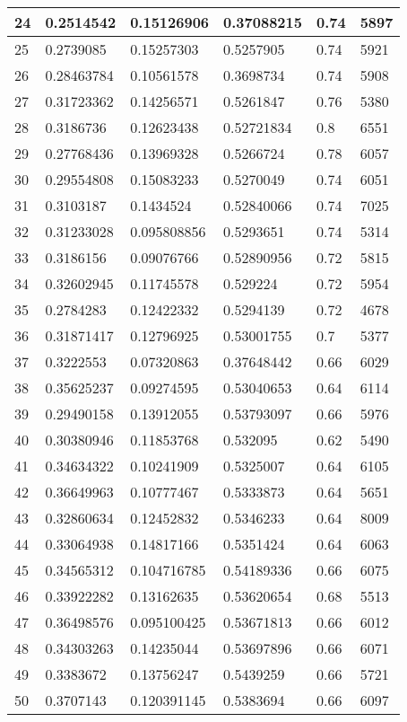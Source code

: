 \begin{longtable}{|l|l|l|l|l|l|}
24 & 0.2514542 & 0.15126906 & 0.37088215 & 0.74 & 5897 \\ \hline 
25 & 0.2739085 & 0.15257303 & 0.5257905 & 0.74 & 5921 \\ \hline 
26 & 0.28463784 & 0.10561578 & 0.3698734 & 0.74 & 5908 \\ \hline 
27 & 0.31723362 & 0.14256571 & 0.5261847 & 0.76 & 5380 \\ \hline 
28 & 0.3186736 & 0.12623438 & 0.52721834 & 0.8 & 6551 \\ \hline 
29 & 0.27768436 & 0.13969328 & 0.5266724 & 0.78 & 6057 \\ \hline 
30 & 0.29554808 & 0.15083233 & 0.5270049 & 0.74 & 6051 \\ \hline 
31 & 0.3103187 & 0.1434524 & 0.52840066 & 0.74 & 7025 \\ \hline 
32 & 0.31233028 & 0.095808856 & 0.5293651 & 0.74 & 5314 \\ \hline 
33 & 0.3186156 & 0.09076766 & 0.52890956 & 0.72 & 5815 \\ \hline 
34 & 0.32602945 & 0.11745578 & 0.529224 & 0.72 & 5954 \\ \hline 
35 & 0.2784283 & 0.12422332 & 0.5294139 & 0.72 & 4678 \\ \hline 
36 & 0.31871417 & 0.12796925 & 0.53001755 & 0.7 & 5377 \\ \hline 
37 & 0.3222553 & 0.07320863 & 0.37648442 & 0.66 & 6029 \\ \hline 
38 & 0.35625237 & 0.09274595 & 0.53040653 & 0.64 & 6114 \\ \hline 
39 & 0.29490158 & 0.13912055 & 0.53793097 & 0.66 & 5976 \\ \hline 
40 & 0.30380946 & 0.11853768 & 0.532095 & 0.62 & 5490 \\ \hline 
41 & 0.34634322 & 0.10241909 & 0.5325007 & 0.64 & 6105 \\ \hline 
42 & 0.36649963 & 0.10777467 & 0.5333873 & 0.64 & 5651 \\ \hline 
43 & 0.32860634 & 0.12452832 & 0.5346233 & 0.64 & 8009 \\ \hline 
44 & 0.33064938 & 0.14817166 & 0.5351424 & 0.64 & 6063 \\ \hline 
45 & 0.34565312 & 0.104716785 & 0.54189336 & 0.66 & 6075 \\ \hline 
46 & 0.33922282 & 0.13162635 & 0.53620654 & 0.68 & 5513 \\ \hline 
47 & 0.36498576 & 0.095100425 & 0.53671813 & 0.66 & 6012 \\ \hline 
48 & 0.34303263 & 0.14235044 & 0.53697896 & 0.66 & 6071 \\ \hline 
49 & 0.3383672 & 0.13756247 & 0.5439259 & 0.66 & 5721 \\ \hline 
50 & 0.3707143 & 0.120391145 & 0.5383694 & 0.66 & 6097 \\ \hline 
\end{longtable}